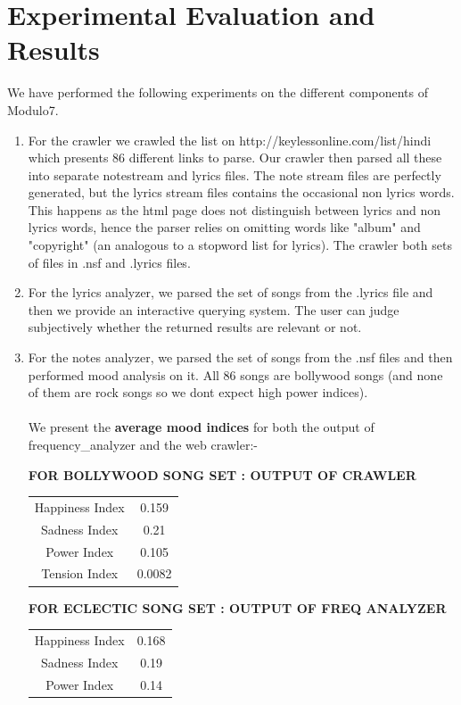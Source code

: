 \documentclass[letterpaper, 11pt]{article}
\begin{document}
\section*{Experimental Evaluation and Results}
We have performed the following experiments on the different components of Modulo7.
\begin{enumerate}
\item For the crawler we crawled the list on http://keylessonline.com/list/hindi which presents 86 different links to parse. Our crawler then parsed all these into separate notestream and lyrics files. The note stream files are perfectly generated, but the lyrics stream files contains the occasional non lyrics words. This happens as the html page does not distinguish between lyrics and non lyrics words, hence the parser relies on omitting words like "album" and "copyright" (an analogous to a stopword list for lyrics). The crawler both sets of files in .nsf and .lyrics files.
\item For the lyrics analyzer, we parsed the set of songs from the .lyrics file and then we provide an interactive querying system. The user can judge subjectively whether the returned results are relevant or not. 
\item For the notes analyzer, we parsed the set of songs from the .nsf files and then performed mood analysis on it. All 86 songs are bollywood songs (and none of them are rock songs so we dont expect high power indices). \\\\
We present the \textbf{average mood indices} for both the output of frequency\_analyzer and the web crawler:-
\begin{center}
\textbf{FOR BOLLYWOOD SONG SET : OUTPUT OF CRAWLER}
\begin{tabular}{ |c|c| } 
 \hline
 Happiness Index & 0.159 \\ 
 Sadness Index & 0.21 \\ 
 Power Index & 0.105 \\ 
 Tension Index & 0.0082\\ 
 \hline
\end{tabular}
\end{center}
\begin{center}
\textbf{FOR ECLECTIC SONG SET : OUTPUT OF FREQ ANALYZER}
\begin{tabular}{ |c|c| } 
 \hline
 Happiness Index & 0.168 \\ 
 Sadness Index & 0.19 \\ 
 Power Index & 0.14 \\ 

\end{tabular}
\end{center}
\end{enumerate}
\end{document}
